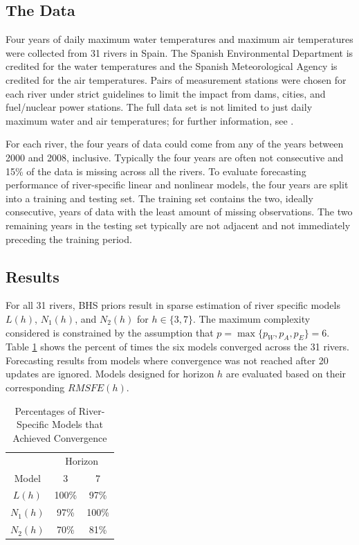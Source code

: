  
 
 
 \vskip 3mm
 
 \subsection{The Data} 
 
Four years of daily maximum water temperatures and maximum air temperatures were collected from 31 rivers in Spain. The Spanish Environmental Department is credited for the water temperatures and the Spanish Meteorological Agency is credited for the air temperatures. Pairs of measurement stations were chosen for each river under strict guidelines to limit the impact from dams, cities, and fuel/nuclear power stations. The full data set is not limited to just daily maximum water and air temperatures; for further information, see \cite{Kamarianakis2016}.
 
For each river, the four years of data could come from any of the years between 2000 and 2008, inclusive. Typically the four years are often not consecutive and 15\% of the data is missing across all the rivers. To evaluate forecasting performance of river-specific linear and nonlinear models, the four years are split into a training and testing set. The training set contains the two, ideally consecutive, years of data with the least amount of missing observations. The two remaining years in the testing set typically are not adjacent and not immediately preceding the training period. 

\vskip 3mm

\subsection{Results}

For all 31 rivers, BHS priors result in sparse estimation of river specific models $L(h)$, $N_1(h)$, and $N_2(h)$ for $h \in \{3,7\}$. The maximum complexity considered is constrained by the assumption that $p=\max \{p_W, p_A, p_E\}=6$. Table \ref{tab:convriv} shows the percent of times the six models converged across the 31 rivers. Forecasting results from models where convergence was not reached after 20 updates are ignored. Models designed for horizon $h$ are evaluated based on their corresponding $RMSFE(h)$.

\begin{table}[!h]
	\small
  \centering
  \caption{ Percentages of River-Specific Models that Achieved Convergence }
    \begin{tabular}{ccc}
    \toprule
    &  \multicolumn{2}{c}{Horizon}  \\
    Model & 3 & 7\\
    \midrule
    $L(h)$ &  100\% & 97\%\\
    $N_1(h)$ & 97\% & 100\%\\
    $N_2(h)$ & 70\% & 81\%\\
    \bottomrule
    \end{tabular}%
  \label{tab:convriv}%
\end{table}%

